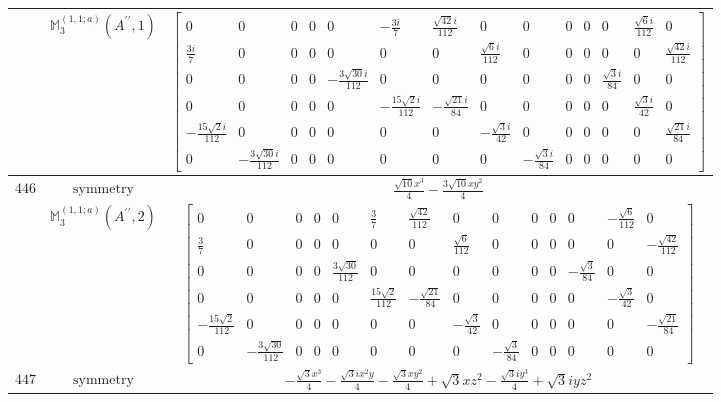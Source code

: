 \documentclass[fleqn,8pt,landscape]{jsarticle}
\begin{document}
\begin{longtable}{ccc}
$  $ & $ \mathbb{M}_{3}^{(1,1;a)}(A^{\prime\prime},1) $ & $ \begin{bmatrix} 0 & 0 & 0 & 0 & 0 & - \frac{3 i}{7} & \frac{\sqrt{42} i}{112} & 0 & 0 & 0 & 0 & 0 & \frac{\sqrt{6} i}{112} & 0 \\ \frac{3 i}{7} & 0 & 0 & 0 & 0 & 0 & 0 & \frac{\sqrt{6} i}{112} & 0 & 0 & 0 & 0 & 0 & \frac{\sqrt{42} i}{112} \\ 0 & 0 & 0 & 0 & - \frac{3 \sqrt{30} i}{112} & 0 & 0 & 0 & 0 & 0 & 0 & \frac{\sqrt{3} i}{84} & 0 & 0 \\ 0 & 0 & 0 & 0 & 0 & - \frac{15 \sqrt{2} i}{112} & - \frac{\sqrt{21} i}{84} & 0 & 0 & 0 & 0 & 0 & \frac{\sqrt{3} i}{42} & 0 \\ - \frac{15 \sqrt{2} i}{112} & 0 & 0 & 0 & 0 & 0 & 0 & - \frac{\sqrt{3} i}{42} & 0 & 0 & 0 & 0 & 0 & \frac{\sqrt{21} i}{84} \\ 0 & - \frac{3 \sqrt{30} i}{112} & 0 & 0 & 0 & 0 & 0 & 0 & - \frac{\sqrt{3} i}{84} & 0 & 0 & 0 & 0 & 0 \end{bmatrix} $ \\ \hline
$ 446 $ & $ \text{symmetry} $ & $ \frac{\sqrt{10} x^{3}}{4} - \frac{3 \sqrt{10} x y^{2}}{4} $ \\
$  $ & $ \mathbb{M}_{3}^{(1,1;a)}(A^{\prime\prime},2) $ & $ \begin{bmatrix} 0 & 0 & 0 & 0 & 0 & \frac{3}{7} & \frac{\sqrt{42}}{112} & 0 & 0 & 0 & 0 & 0 & - \frac{\sqrt{6}}{112} & 0 \\ \frac{3}{7} & 0 & 0 & 0 & 0 & 0 & 0 & \frac{\sqrt{6}}{112} & 0 & 0 & 0 & 0 & 0 & - \frac{\sqrt{42}}{112} \\ 0 & 0 & 0 & 0 & \frac{3 \sqrt{30}}{112} & 0 & 0 & 0 & 0 & 0 & 0 & - \frac{\sqrt{3}}{84} & 0 & 0 \\ 0 & 0 & 0 & 0 & 0 & \frac{15 \sqrt{2}}{112} & - \frac{\sqrt{21}}{84} & 0 & 0 & 0 & 0 & 0 & - \frac{\sqrt{3}}{42} & 0 \\ - \frac{15 \sqrt{2}}{112} & 0 & 0 & 0 & 0 & 0 & 0 & - \frac{\sqrt{3}}{42} & 0 & 0 & 0 & 0 & 0 & - \frac{\sqrt{21}}{84} \\ 0 & - \frac{3 \sqrt{30}}{112} & 0 & 0 & 0 & 0 & 0 & 0 & - \frac{\sqrt{3}}{84} & 0 & 0 & 0 & 0 & 0 \end{bmatrix} $ \\ \hline
$ 447 $ & $ \text{symmetry} $ & $ - \frac{\sqrt{3} x^{3}}{4} - \frac{\sqrt{3} i x^{2} y}{4} - \frac{\sqrt{3} x y^{2}}{4} + \sqrt{3} x z^{2} - \frac{\sqrt{3} i y^{3}}{4} + \sqrt{3} i y z^{2} $ \\

\end{longtable}
\end{document}
